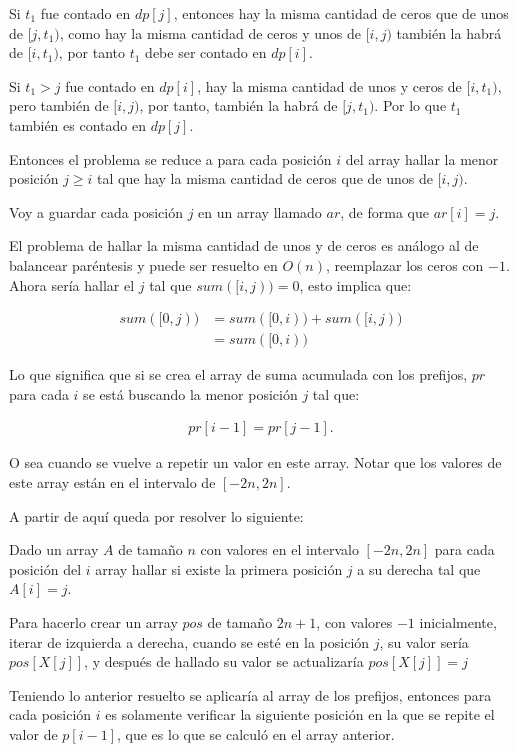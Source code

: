 \documentclass[14pt]{extarticle}
\begin{document}
Si $t_1$ fue contado en $dp[j]$, entonces hay la misma cantidad de ceros que de unos de $[j, t_1)$, como hay la misma cantidad de ceros y unos de $[i, j)$ también la habrá de $[i, t_1)$, por tanto $t_1$ debe ser contado en $dp[i]$.

Si $t_1 > j$ fue contado en $dp[i]$, hay la misma cantidad de unos y ceros de $[i, t_1)$, pero también de $[i, j)$, por tanto, también la habrá de $[j, t_1)$. Por lo que $t_1$ también es contado en $dp[j]$.

Entonces el problema se reduce a para cada posición $i$ del array hallar la menor posición $j \geq i$ tal que hay la misma cantidad de ceros que de unos de $[i, j)$.

Voy a guardar cada posición $j$ en un array llamado $ar$, de forma que $ar[i] = j$.

El problema de hallar la misma cantidad de unos y de ceros es análogo al de balancear paréntesis y puede ser resuelto en $O(n)$, reemplazar los ceros con $-1$. Ahora sería hallar el $j$ tal que $sum([i, j)) = 0$, esto implica que:

\begin{align}
sum([0, j)) &= sum([0, i)) + sum([i, j)) \\
&= sum([0, i))
\end{align}

Lo que significa que si se crea el array de suma acumulada con los prefijos, $pr$ para cada $i$ se está buscando la menor posición $j$ tal que:

\begin{align}
pr[i-1] = pr[j-1].
\end{align}

O sea cuando se vuelve a repetir un valor en este array. Notar que los valores de este array están en el intervalo de $[-2n, 2n]$. 

A partir de aquí queda por resolver lo siguiente:

Dado un array $A$ de tamaño $n$ con valores en el intervalo $[-2n, 2n]$ para cada posición del $i$ array hallar si existe la primera posición $j$ a su derecha tal que $A[i] = j$. 

Para hacerlo crear un array $pos$ de tamaño $2n + 1$, con valores $-1$ inicialmente, iterar de izquierda a derecha, cuando se esté en la posición $j$, su valor sería $pos[X[j]]$, y después de hallado su valor se actualizaría $pos[X[j]] = j$

Teniendo lo anterior resuelto se aplicaría al array de los prefijos, entonces para cada posición $i$ es solamente verificar la siguiente posición en la que se repite el valor de $p[i-1]$, que es lo que se calculó en el array anterior.
\end{document}
